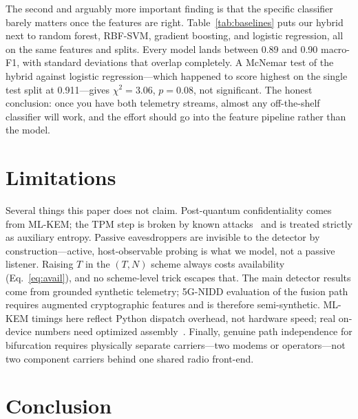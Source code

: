 \documentclass[conference]{IEEEtran}
\begin{document}
The second and arguably more important finding is that the specific classifier
barely matters once the features are right. Table~\ref{tab:baselines} puts our
hybrid next to random forest, RBF-SVM, gradient boosting, and logistic regression,
all on the same features and splits. Every model lands between 0.89 and 0.90
macro-F1, with standard deviations that overlap completely. A McNemar test of the
hybrid against logistic regression---which happened to score highest on the single
test split at 0.911---gives $\chi^2{=}3.06$, $p{=}0.08$, not significant. The
honest conclusion: once you have both telemetry streams, almost any off-the-shelf
classifier will work, and the effort should go into the feature pipeline rather than
the model.



\section{Limitations}

Several things this paper does not claim. Post-quantum confidentiality comes from
ML-KEM; the TPM step is broken by known attacks~\cite{klimov2002analysis,
shacham2004cooperating} and is treated strictly as auxiliary entropy. Passive
eavesdroppers are invisible to the detector by construction---active, host-observable
probing is what we model, not a passive listener. Raising $T$ in the $(T,N)$ scheme
always costs availability (Eq.~\ref{eq:avail}), and no scheme-level trick escapes
that. The main detector results come from grounded synthetic telemetry; 5G-NIDD
evaluation of the fusion path requires augmented cryptographic features and is
therefore semi-synthetic. ML-KEM timings here reflect Python dispatch overhead, not
hardware speed; real on-device numbers need optimized assembly~\cite{kannwischer2019pqm4}.
Finally, genuine path independence for bifurcation requires physically separate
carriers---two modems or operators---not two component carriers behind one shared
radio front-end.

\section{Conclusion}
\end{document}
